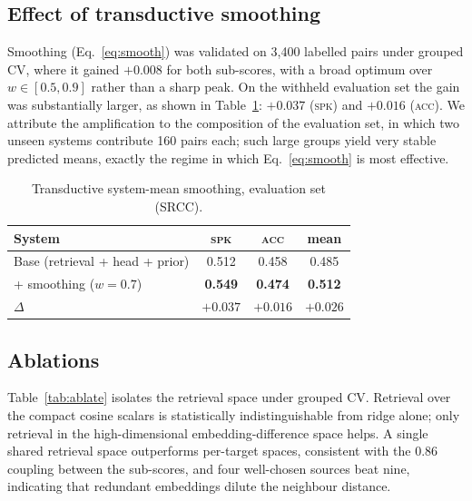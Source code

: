 \documentclass{article}
\begin{document}
\subsection{Effect of transductive smoothing}

Smoothing (Eq.~\ref{eq:smooth}) was validated on 3{,}400 labelled pairs under
grouped CV, where it gained $+0.008$ for both sub-scores, with a broad optimum
over $w\in[0.5,0.9]$ rather than a sharp peak. On the withheld evaluation set the
gain was substantially larger, as shown in Table~\ref{tab:smooth}: $+0.037$
(\textsc{spk}) and $+0.016$ (\textsc{acc}). We attribute the amplification to the
composition of the evaluation set, in which two unseen systems contribute 160
pairs each; such large groups yield very stable predicted means, exactly the
regime in which Eq.~\ref{eq:smooth} is most effective.

\begin{table}[t]
\centering
\caption{Transductive system-mean smoothing, evaluation set (SRCC).}
\label{tab:smooth}
\small
\begin{tabular}{lccc}
\toprule
System & \textsc{spk} & \textsc{acc} & mean \\
\midrule
Base (retrieval + head + prior) & 0.512 & 0.458 & 0.485 \\
\quad + smoothing ($w=0.7$)     & \textbf{0.549} & \textbf{0.474} & \textbf{0.512} \\
$\Delta$                        & $+0.037$ & $+0.016$ & $+0.026$ \\
\bottomrule
\end{tabular}
\end{table}

\subsection{Ablations}
\label{sec:ablation}

Table~\ref{tab:ablate} isolates the retrieval space under grouped CV. Retrieval
over the compact cosine scalars is statistically indistinguishable from ridge
alone; only retrieval in the high-dimensional embedding-difference space helps.
A single shared retrieval space outperforms per-target spaces, consistent with
the $0.86$ coupling between the sub-scores, and four well-chosen sources beat
nine, indicating that redundant embeddings dilute the neighbour distance.
\end{document}
